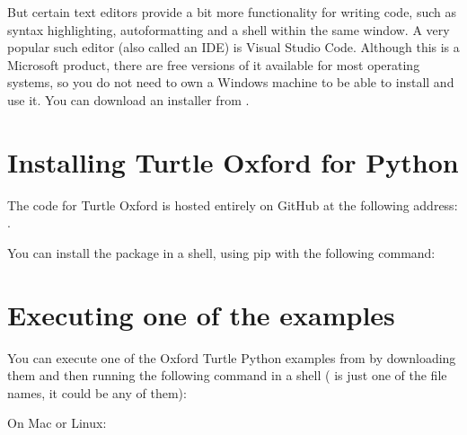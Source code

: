 \documentclass[letterpaper,10pt,english]{sphinxmanual}
\begin{document}
\sphinxAtStartPar
But certain text editors provide a bit more functionality for writing code, such as syntax highlighting, auto\sphinxhyphen{}formatting and a shell within the same window.
A very popular such editor (also called an IDE) is Visual Studio Code. Although this is a Microsoft product, there are free versions of it available for most
operating systems, so you do not need to own a Windows machine to be able to install and use it. You can download an installer from .


\section{Installing Turtle Oxford for Python}
\label{\detokenize{usage:installing-turtle-oxford-for-python}}
\sphinxAtStartPar
The code for Turtle Oxford is hosted entirely on GitHub at the following address: .

\sphinxAtStartPar
You can install the package in a shell, using pip with the following command:

\begin{sphinxVerbatim}[commandchars=\\\{\}]
  
\end{sphinxVerbatim}


\section{Executing one of the examples}
\label{\detokenize{usage:executing-one-of-the-examples}}
\sphinxAtStartPar
You can execute one of the Oxford Turtle Python examples from  by downloading them
and then running the following command in a shell ( is just one of the file names, it could be any of them):

\sphinxAtStartPar
On Mac or Linux:

\begin{sphinxVerbatim}[commandchars=\\\{\}]
 
\end{sphinxVerbatim}
\end{document}
